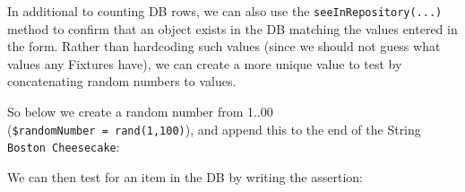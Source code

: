 \documentclass[a4paperpaper,openright]{book}
\newenvironment{Shaded}{}{}
\newcommand{\CommentTok}[1]{\textcolor[rgb]{0.38,0.63,0.69}{\textit{#1}}}
\newcommand{\DecValTok}[1]{\textcolor[rgb]{0.25,0.63,0.44}{#1}}
\newcommand{\FunctionTok}[1]{\textcolor[rgb]{0.02,0.16,0.49}{#1}}
\newcommand{\KeywordTok}[1]{\textcolor[rgb]{0.00,0.44,0.13}{\textbf{#1}}}
\newcommand{\NormalTok}[1]{#1}
\newcommand{\OtherTok}[1]{\textcolor[rgb]{0.00,0.44,0.13}{#1}}
\newcommand{\StringTok}[1]{\textcolor[rgb]{0.25,0.44,0.63}{#1}}
\begin{document}
In additional to counting DB rows, we can also use the
\texttt{seeInRepository(...)} method to confirm that an object exists in
the DB matching the values entered in the form. Rather than hardcoding
such values (since we should not guess what values any Fixtures have),
we can create a more unique value to test by concatenating random
numbers to values.

So below we create a random number from 1..00
(\texttt{\$randomNumber\ =\ rand(1,100)}), and append this to the end of
the String \texttt{Boston\ Cheesecake}:

\begin{Shaded}
\end{Shaded}

We can then test for an item in the DB by writing the assertion:

\begin{Shaded}
\end{Shaded}
\end{document}
